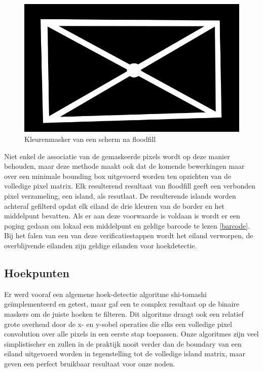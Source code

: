 \begin{figure}[h]
\centering
\includegraphics[scale=0.5]{img/mask.png}
\caption{Kleurenmasker van een scherm na floodfill}
\end{figure}

Niet enkel de associatie van de gemaskeerde pixels wordt op deze manier behouden, maar deze methode maakt ook dat de komende bewerkingen maar over een minimale bounding box uitgevoerd worden ten opzichten van de volledige pixel matrix. Elk resulterend resultaat van floodfill geeft een verbonden pixel verzameling, een island, als resutlaat. De resulterende islands worden achteraf gefilterd opdat elk eiland de drie kleuren van de border en het middelpunt bevatten. Als er aan deze voorwaarde is voldaan is wordt er een poging gedaan om lokaal een middelpunt en geldige barcode te lezen \ref{barcode}. Bij het falen van een van deze verificatiestappen wordt het eiland verworpen, de overblijvende eilanden zijn geldige eilanden voor hoekdetectie.

\subsection{Hoekpunten}
Er werd vooraf een algemene hoek-detectie algoritme shi-tomashi geïmplementeerd en getest, maar gaf een te complex resultaat op de binaire maskers om de juiste hoeken te filteren. Dit algoritme draagt ook een relatief grote overhead door de x- en y-sobel operaties die elks een volledige pixel convolution over alle pixels in een eerste stap toepassen. Onze algoritmes zijn veel simplistischer en zullen in de praktijk nooit verder dan de boundary van een eiland uitgevoerd worden in tegenstelling tot de volledige island matrix, maar geven een perfect bruikbaar resultaat voor onze noden.

